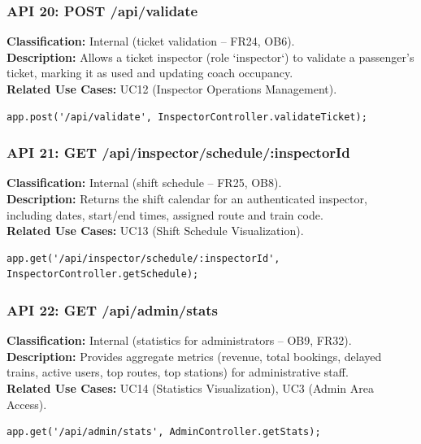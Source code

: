 \documentclass{article}
\begin{document}
\subsubsection*{API 20: POST /api/validate}
\textbf{Classification:} Internal (ticket validation – FR24, OB6).\\
\textbf{Description:} Allows a ticket inspector (role `inspector`) to validate
a passenger's ticket, marking it as used and updating coach occupancy.\\
\textbf{Related Use Cases:} UC12 (Inspector Operations Management).
\begin{verbatim}
app.post('/api/validate', InspectorController.validateTicket);
\end{verbatim}

\subsubsection*{API 21: GET /api/inspector/schedule/:inspectorId}
\textbf{Classification:} Internal (shift schedule – FR25, OB8).\\
\textbf{Description:} Returns the shift calendar for an authenticated inspector,
including dates, start/end times, assigned route and train code.\\
\textbf{Related Use Cases:} UC13 (Shift Schedule Visualization).
\begin{verbatim}
app.get('/api/inspector/schedule/:inspectorId', InspectorController.getSchedule);
\end{verbatim}

\subsubsection*{API 22: GET /api/admin/stats}
\textbf{Classification:} Internal (statistics for administrators – OB9, FR32).\\
\textbf{Description:} Provides aggregate metrics (revenue, total bookings,
delayed trains, active users, top routes, top stations) for administrative staff.\\
\textbf{Related Use Cases:} UC14 (Statistics Visualization), UC3 (Admin Area Access).
\begin{verbatim}
app.get('/api/admin/stats', AdminController.getStats);
\end{verbatim}
\end{document}
